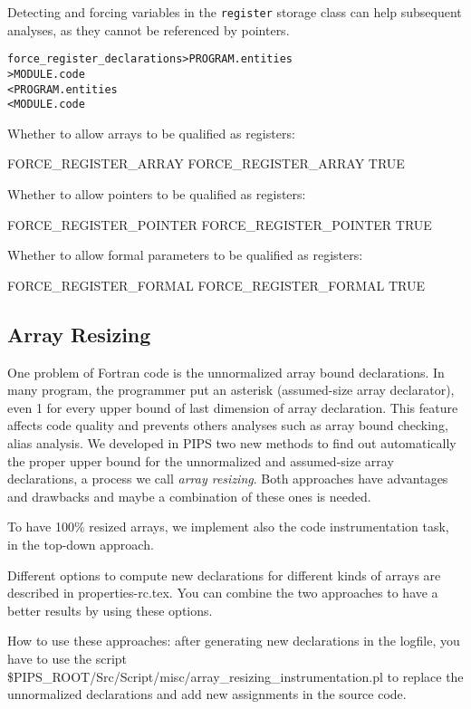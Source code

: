 \documentclass[a4paper]{report}
\newenvironment{PipsMake}{\begin{alltt}}{\end{alltt}}
\begin{document}
Detecting and forcing variables in the \texttt{register} storage class can
help subsequent analyses, as they cannot be referenced by pointers.
\begin{PipsMake}
force_register_declarations > PROGRAM.entities
                            > MODULE.code
         < PROGRAM.entities
         < MODULE.code
\end{PipsMake}

Whether to allow arrays to be qualified as registers:
\begin{PipsProp}{FORCE_REGISTER_ARRAY}
FORCE_REGISTER_ARRAY TRUE
\end{PipsProp}

Whether to allow pointers to be qualified as registers:
\begin{PipsProp}{FORCE_REGISTER_POINTER}
FORCE_REGISTER_POINTER TRUE
\end{PipsProp}

Whether to allow formal parameters to be qualified as registers:
\begin{PipsProp}{FORCE_REGISTER_FORMAL}
FORCE_REGISTER_FORMAL TRUE
\end{PipsProp}

\subsection{Array Resizing}
\label{subsubsection-array-resizing}

One problem of Fortran code is the unnormalized array bound
declarations. In many program, the programmer put an asterisk
(assumed-size array declarator), even 1 for every
upper bound of last dimension of array declaration. This feature affects
code quality and prevents others analyses such as array bound checking,
alias analysis. We developed in PIPS two new methods to find out
automatically the proper upper bound for the unnormalized and assumed-size
array declarations, a process we call {\em array resizing}. Both
approaches have advantages and drawbacks and maybe a combination of these
ones is needed.

To have 100\% resized arrays, we implement also the code instrumentation
task, in the top-down approach.

Different options to compute new declarations for different kinds of
arrays are described in properties-rc.tex. You can combine the two
approaches to have a better results by using these options.

How to use these approaches: after generating new declarations in the
logfile, you have to use the script
\$PIPS\_ROOT/Src/Script/misc/array\_resizing\_instrumentation.pl to replace the unnormalized
declarations and add new assignments in the source code.
\end{document}
